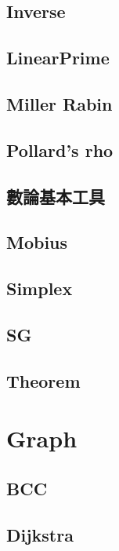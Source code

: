 \subsection{Inverse}

\subsection{LinearPrime}

\subsection{Miller Rabin}

\subsection{Pollard's rho}

\subsection{數論基本工具}

\subsection{Mobius}

\subsection{Simplex}

\subsection{SG}

\subsection{Theorem}



\section{Graph}

\subsection{BCC}

\subsection{Dijkstra}

